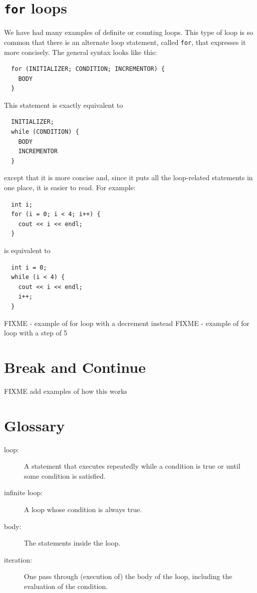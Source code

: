 \section{{\tt for} loops}
We have had many examples of definite or counting loops.
This type of loop is so common that there is an alternate
loop statement, called {\tt for}, that expresses it more
concisely.  The general syntax looks like this:

\begin{verbatim}
  for (INITIALIZER; CONDITION; INCREMENTOR) {
    BODY
  }
\end{verbatim}
%
This statement is exactly equivalent to

\begin{verbatim}
  INITIALIZER;
  while (CONDITION) {
    BODY
    INCREMENTOR
  }
\end{verbatim}
%
except that it is more concise and, since it puts all the
loop-related statements in one place, it is easier to read.
For example:

\begin{verbatim}
  int i;
  for (i = 0; i < 4; i++) {
    cout << i << endl;
  }
\end{verbatim}
%
is equivalent to 

\begin{verbatim}
  int i = 0;
  while (i < 4) {
    cout << i << endl;
    i++;
  }
\end{verbatim}

FIXME - example of for loop with a decrement instead
FIXME - example of for loop with a step of 5

\section{Break and Continue}
FIXME add examples of how this works
\section{Glossary}

\begin{description}

\item[loop:]  A statement that executes repeatedly while a
condition is true or until some condition is satisfied.

\item[infinite loop:]  A loop whose condition is always true.

\item[body:]  The statements inside the loop.

\item[iteration:]  One pass through (execution of) the body
of the loop, including the evaluation of the condition.




\end{description}

